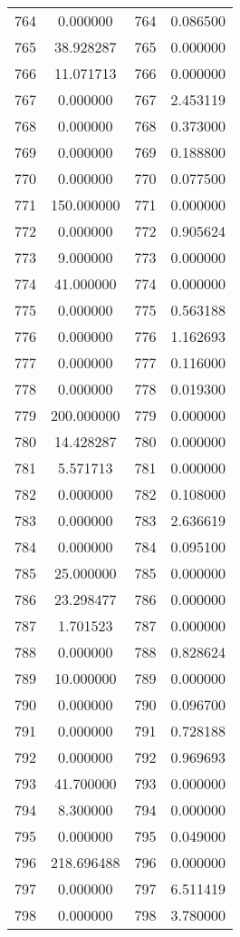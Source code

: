 \documentclass[12pt]{article}
\begin{document}
\begin{longtable}{@{}cccc@{}}
764 & 0.000000 & 764 & 0.086500 \\
765 & 38.928287 & 765 & 0.000000 \\
766 & 11.071713 & 766 & 0.000000 \\
767 & 0.000000 & 767 & 2.453119 \\
768 & 0.000000 & 768 & 0.373000 \\
769 & 0.000000 & 769 & 0.188800 \\
770 & 0.000000 & 770 & 0.077500 \\
771 & 150.000000 & 771 & 0.000000 \\
772 & 0.000000 & 772 & 0.905624 \\
773 & 9.000000 & 773 & 0.000000 \\
774 & 41.000000 & 774 & 0.000000 \\
775 & 0.000000 & 775 & 0.563188 \\
776 & 0.000000 & 776 & 1.162693 \\
777 & 0.000000 & 777 & 0.116000 \\
778 & 0.000000 & 778 & 0.019300 \\
779 & 200.000000 & 779 & 0.000000 \\
780 & 14.428287 & 780 & 0.000000 \\
781 & 5.571713 & 781 & 0.000000 \\
782 & 0.000000 & 782 & 0.108000 \\
783 & 0.000000 & 783 & 2.636619 \\
784 & 0.000000 & 784 & 0.095100 \\
785 & 25.000000 & 785 & 0.000000 \\
786 & 23.298477 & 786 & 0.000000 \\
787 & 1.701523 & 787 & 0.000000 \\
788 & 0.000000 & 788 & 0.828624 \\
789 & 10.000000 & 789 & 0.000000 \\
790 & 0.000000 & 790 & 0.096700 \\
791 & 0.000000 & 791 & 0.728188 \\
792 & 0.000000 & 792 & 0.969693 \\
793 & 41.700000 & 793 & 0.000000 \\
794 & 8.300000 & 794 & 0.000000 \\
795 & 0.000000 & 795 & 0.049000 \\
796 & 218.696488 & 796 & 0.000000 \\
797 & 0.000000 & 797 & 6.511419 \\
798 & 0.000000 & 798 & 3.780000 \\

\end{longtable}
\end{document}
